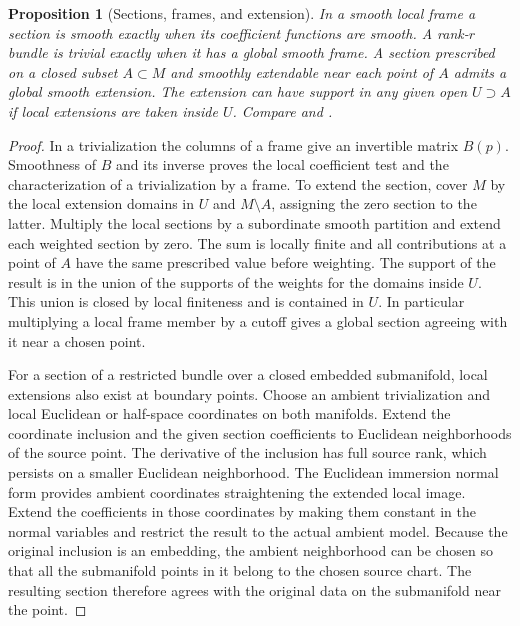 \documentclass[11pt,oneside,openany]{book}
\newtheorem{proposition}[theorem]{Proposition}
\theoremstyle{definition}
\theoremstyle{remark}
\begin{document}
\begin{proposition}[Sections, frames, and extension]\label{p104:M05.02}
In a smooth local frame a section is smooth exactly when its coefficient functions are smooth. A rank-\(r\) bundle is trivial exactly when it has a global smooth frame. A section prescribed on a closed subset \(A\subset M\) and smoothly extendable near each point of \(A\) admits a global smooth extension. The extension can have support in any given open \(U\supset A\) if local extensions are taken inside \(U\). Compare \cite[pp.\ 255--261]{lee} and \cite[\S\S12.4--12.5]{tu}.
\end{proposition}
\begin{proof}
In a trivialization the columns of a frame give an invertible matrix \(B(p)\). Smoothness of \(B\) and its inverse proves the local coefficient test and the characterization of a trivialization by a frame. To extend the section, cover \(M\) by the local extension domains in \(U\) and \(M\setminus A\), assigning the zero section to the latter. Multiply the local sections by a subordinate smooth partition and extend each weighted section by zero. The sum is locally finite and all contributions at a point of \(A\) have the same prescribed value before weighting. The support of the result is in the union of the supports of the weights for the domains inside \(U\). This union is closed by local finiteness and is contained in \(U\). In particular multiplying a local frame member by a cutoff gives a global section agreeing with it near a chosen point.

For a section of a restricted bundle over a closed embedded submanifold, local extensions also exist at boundary points. Choose an ambient trivialization and local Euclidean or half-space coordinates on both manifolds. Extend the coordinate inclusion and the given section coefficients to Euclidean neighborhoods of the source point. The derivative of the inclusion has full source rank, which persists on a smaller Euclidean neighborhood. The Euclidean immersion normal form provides ambient coordinates straightening the extended local image. Extend the coefficients in those coordinates by making them constant in the normal variables and restrict the result to the actual ambient model. Because the original inclusion is an embedding, the ambient neighborhood can be chosen so that all the submanifold points in it belong to the chosen source chart. The resulting section therefore agrees with the original data on the submanifold near the point.
\end{proof}
\end{document}
